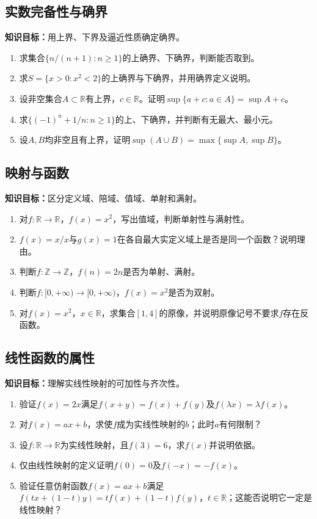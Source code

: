 \documentclass[11pt,a4paper,fontset=fandol]{ctexrep}
\newcommand{\goal}[1]{\textbf{知识目标：}#1\par}
\begin{document}
\subsection{实数完备性与确界}
\goal{用上界、下界及逼近性质确定确界。}
\begin{enumerate}
\item 求集合$\{n/(n+1):n\ge1\}$的上确界、下确界，判断能否取到。
\item 求$S=\{x>0:x^2<2\}$的上确界与下确界，并用确界定义说明。
\item 设非空集合$A\subset\mathbb R$有上界，$c\in\mathbb R$。证明$\sup\{a+c:a\in A\}=\sup A+c$。
\item 求$\{(-1)^n+1/n:n\ge1\}$的上、下确界，并判断有无最大、最小元。
\item 设$A,B$均非空且有上界，证明$\sup(A\cup B)=\max\{\sup A,\sup B\}$。
\end{enumerate}
\subsection{映射与函数}
\goal{区分定义域、陪域、值域、单射和满射。}
\begin{enumerate}
\item 对$f:\mathbb R\to\mathbb R$，$f(x)=x^2$，写出值域，判断单射性与满射性。
\item $f(x)=x/x$与$g(x)=1$在各自最大实定义域上是否是同一个函数？说明理由。
\item 判断$f:\mathbb Z\to\mathbb Z$，$f(n)=2n$是否为单射、满射。
\item 判断$f:[0,+\infty)\to[0,+\infty)$，$f(x)=x^2$是否为双射。
\item 对$f(x)=x^2$，$x\in\mathbb R$，求集合$[1,4]$的原像，并说明原像记号不要求$f$存在反函数。
\end{enumerate}
\subsection{线性函数的属性}
\goal{理解实线性映射的可加性与齐次性。}
\begin{enumerate}
\item 验证$f(x)=2x$满足$f(x+y)=f(x)+f(y)$及$f(\lambda x)=\lambda f(x)$。
\item 对$f(x)=ax+b$，求使$f$成为实线性映射的$b$；此时$a$有何限制？
\item 设$f:\mathbb R\to\mathbb R$为实线性映射，且$f(3)=6$，求$f(x)$并说明依据。
\item 仅由线性映射的定义证明$f(0)=0$及$f(-x)=-f(x)$。
\item 验证任意仿射函数$f(x)=ax+b$满足$f(tx+(1-t)y)=tf(x)+(1-t)f(y)$，$t\in\mathbb R$；这能否说明它一定是线性映射？
\end{enumerate}
\end{document}
